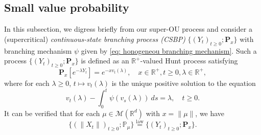\documentclass[12pt,a4paper]{amsart}
\theoremstyle{plain}
\theoremstyle{definition}
\numberwithin{equation}{section}
\begin{document}
\subsection{Small value probability}
\label{sec: Small value probability}
    In this subsection, we digress briefly from our super-OU process and consider a (supercritical) \emph{continuous-state branching process (CSBP)} $\{(Y_t)_{t\geq 0}; \mathbf P_x\}$ with branching mechanism $\psi$ given by \eqref{eq: honogeneou branching mechanism}.
    Such a process $\{(Y_t)_{t\geq 0}; \mathbf P_x\}$ is defined as an $\mathbb R^+$-valued Hunt process satisfying 
\[
    \mathbf P_x[e^{-\lambda Y_t}] = e^{- x v_t(\lambda)},
    \quad x\in \mathbb R^+, t\geq 0, \lambda \in \mathbb R^+,
\]
    where for each $\lambda\geq 0$, $t\mapsto v_t(\lambda)$ is the unique positive solution to the equation
\begin{equation}
\label{eq: fkpp equation for CSBP}
    v_t(\lambda) - \int_0^t \psi(v_s(\lambda))~ds = \lambda,
    \quad t\geq 0.
\end{equation}
    It can be verified that for each $\mu \in \mathcal M(\mathbb R^d)$ with $x = \| \mu \|$, we have
\[
    \{(\|X_t\|)_{t\geq 0}; \mathbb P_\mu\}
    \overset{\text{law}}{=} \{(Y_t)_{t\geq 0}; \mathbf P_x\}.
\]
\end{document}
